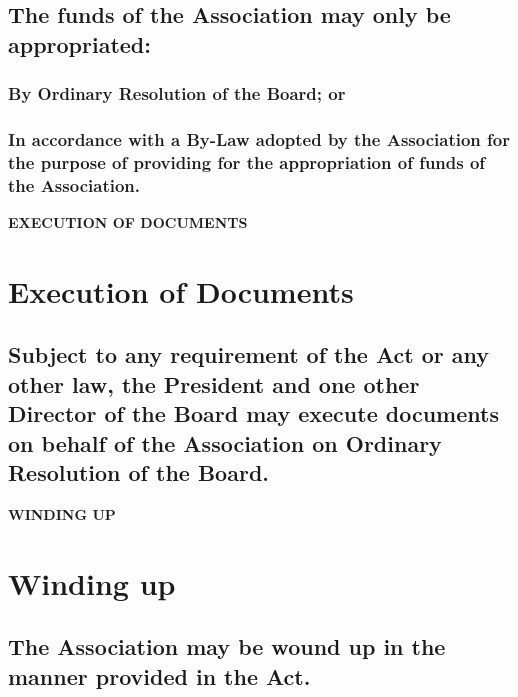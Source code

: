 \documentclass{article}
\newenvironment{subs}
  {\adjustwidth{2em}{0pt}}
  {\endadjustwidth}
\begin{document}
\begin{subs}
\begin{subs}
\begin{subs}
\subsection{The funds of the Association may only be appropriated:}
\begin{subs}
\subsubsection{By Ordinary Resolution of the Board; or}
\subsubsection{In accordance with a By-Law adopted by the Association for the purpose of providing for the appropriation of funds of the Association.}
\end{subs}
\end{subs}

\vspace{5mm}
{\large\bf EXECUTION OF DOCUMENTS\par}
\hrulefill
\vspace{5mm}

\section{Execution of Documents}
\begin{subs}
\subsection{Subject to any requirement of the Act or any other law, the President and one other Director of the Board may execute documents on behalf of the Association on Ordinary Resolution of the Board.}
\end{subs}

{\large\bf WINDING UP\par}
\hrulefill
\vspace{5mm}

\section{Winding up}
\begin{subs}
\subsection{The Association may be wound up in the manner provided in the Act.}
\end{subs}


\end{subs}
\end{subs}
\end{document}
